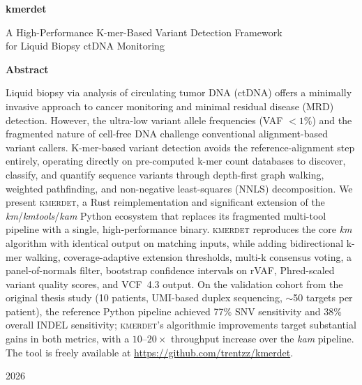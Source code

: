 \documentclass[12pt,a4paper]{article}
\newcommand{\kmerdet}{\textsc{kmerdet}}
\newcommand{\km}{\textit{km}}
\newcommand{\kmtools}{\textit{kmtools}}
\newcommand{\kam}{\textit{kam}}
\newcommand{\ctDNA}{ctDNA}
\begin{document}
\begin{titlepage}
  \centering
  \vspace*{3cm}

  {\Huge\bfseries kmerdet\par}
  \vspace{0.5cm}
  {\Large A High-Performance K-mer-Based Variant Detection Framework\\
   for Liquid Biopsy ctDNA Monitoring\par}

  \vspace{2cm}


  \vspace{2cm}

  {\large
    \textbf{Abstract}\par
  }
  \vspace{0.5cm}

  \begin{minipage}{0.85\textwidth}
    \noindent
    Liquid biopsy via analysis of circulating tumor DNA (\ctDNA) offers a
    minimally invasive approach to cancer monitoring and minimal residual
    disease (MRD) detection.  However, the ultra-low variant allele
    frequencies (VAF $<1\%$) and the fragmented nature of cell-free DNA
    challenge conventional alignment-based variant callers.  K-mer-based
    variant detection avoids the reference-alignment step entirely,
    operating directly on pre-computed k-mer count databases to discover,
    classify, and quantify sequence variants through depth-first graph
    walking, weighted pathfinding, and non-negative least-squares (NNLS)
    decomposition.  We present \kmerdet{}, a Rust reimplementation and
    significant extension of the \km{}/\kmtools{}/\kam{} Python ecosystem that
    replaces its fragmented multi-tool pipeline with a single, high-performance
    binary.  \kmerdet{} reproduces the core \km{} algorithm with identical
    output on matching inputs, while adding bidirectional k-mer walking,
    coverage-adaptive extension thresholds, multi-k consensus voting, a
    panel-of-normals filter, bootstrap confidence intervals on rVAF, Phred-scaled
    variant quality scores, and VCF~4.3 output.  On the validation cohort from
    the original thesis study (10 patients, UMI-based duplex sequencing,
    $\sim$50 targets per patient), the reference Python pipeline achieved 77\%
    SNV sensitivity and 38\% overall INDEL sensitivity; \kmerdet{}'s algorithmic
    improvements target substantial gains in both metrics, with a $10\text{--}20\times$
    throughput increase over the \kam{} pipeline.  The tool is freely available
    at \url{https://github.com/trentzz/kmerdet}.
  \end{minipage}

  \vfill

  {\large 2026\par}
\end{titlepage}
\end{document}
